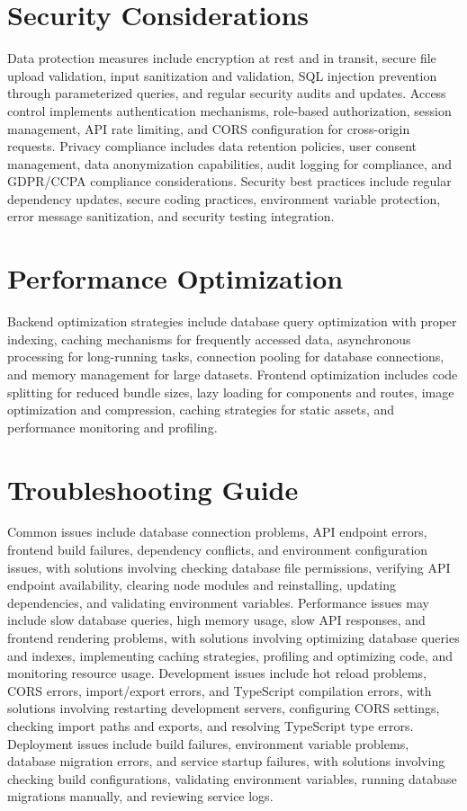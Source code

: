 \documentclass{article}
\begin{document}
\section{Security Considerations}
Data protection measures include encryption at rest and in transit, secure file upload validation, input sanitization and validation, SQL injection prevention through parameterized queries, and regular security audits and updates. Access control implements authentication mechanisms, role-based authorization, session management, API rate limiting, and CORS configuration for cross-origin requests. Privacy compliance includes data retention policies, user consent management, data anonymization capabilities, audit logging for compliance, and GDPR/CCPA compliance considerations. Security best practices include regular dependency updates, secure coding practices, environment variable protection, error message sanitization, and security testing integration.

\section{Performance Optimization}
Backend optimization strategies include database query optimization with proper indexing, caching mechanisms for frequently accessed data, asynchronous processing for long-running tasks, connection pooling for database connections, and memory management for large datasets. Frontend optimization includes code splitting for reduced bundle sizes, lazy loading for components and routes, image optimization and compression, caching strategies for static assets, and performance monitoring and profiling.

\section{Troubleshooting Guide}
Common issues include database connection problems, API endpoint errors, frontend build failures, dependency conflicts, and environment configuration issues, with solutions involving checking database file permissions, verifying API endpoint availability, clearing node modules and reinstalling, updating dependencies, and validating environment variables. Performance issues may include slow database queries, high memory usage, slow API responses, and frontend rendering problems, with solutions involving optimizing database queries and indexes, implementing caching strategies, profiling and optimizing code, and monitoring resource usage. Development issues include hot reload problems, CORS errors, import/export errors, and TypeScript compilation errors, with solutions involving restarting development servers, configuring CORS settings, checking import paths and exports, and resolving TypeScript type errors. Deployment issues include build failures, environment variable problems, database migration errors, and service startup failures, with solutions involving checking build configurations, validating environment variables, running database migrations manually, and reviewing service logs.
\end{document}
